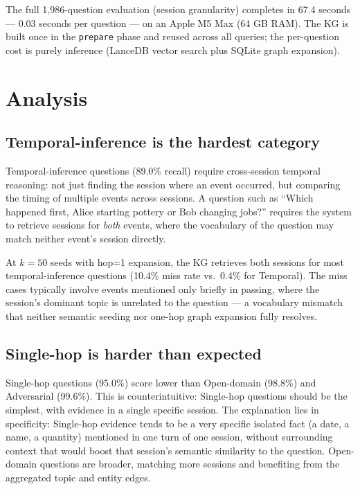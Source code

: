 \documentclass[11pt,a4paper]{article}
\begin{document}
The full 1,986-question evaluation (session granularity) completes in
67.4 seconds --- 0.03 seconds per question --- on an Apple M5 Max (64 GB RAM).
The KG is built once in the \texttt{prepare} phase and reused across all
queries; the per-question cost is purely inference (LanceDB vector search
plus SQLite graph expansion).

\section{Analysis}
\label{sec:analysis}

\subsection{Temporal-inference is the hardest category}

Temporal-inference questions (89.0\% recall) require cross-session temporal
reasoning: not just finding the session where an event occurred, but
comparing the timing of multiple events across sessions.
A question such as ``Which happened first, Alice starting pottery or Bob
changing jobs?'' requires the system to retrieve sessions for \emph{both}
events, where the vocabulary of the question may match neither event's
session directly.

At $k{=}50$ seeds with hop=1 expansion, the KG retrieves both sessions for
most temporal-inference questions (10.4\% miss rate vs.\ 0.4\% for
Temporal).
The miss cases typically involve events mentioned only briefly in passing,
where the session's dominant topic is unrelated to the question --- a
vocabulary mismatch that neither semantic seeding nor one-hop graph expansion
fully resolves.

\subsection{Single-hop is harder than expected}

Single-hop questions (95.0\%) score lower than Open-domain (98.8\%) and
Adversarial (99.6\%).
This is counterintuitive: Single-hop questions should be the simplest, with
evidence in a single specific session.
The explanation lies in specificity: Single-hop evidence tends to be a very
specific isolated fact (a date, a name, a quantity) mentioned in one turn of
one session, without surrounding context that would boost that session's
semantic similarity to the question.
Open-domain questions are broader, matching more sessions and benefiting from
the aggregated topic and entity edges.
\end{document}

